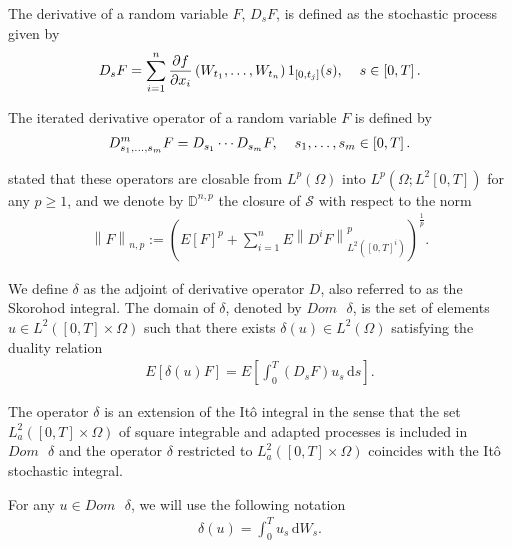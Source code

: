 \documentclass[a4paper,10pt]{article}
\renewcommand{\d}{\,\mathrm{d}}
\newcommand{\1}{\mathbf{1}}
\begin{document}
\medbreak

The derivative of a random variable $F$, $D_{s}F$, is defined as the stochastic process given by
\begin{eqnarray*}
D_{s}F = \sum^{n}_{i=1} \frac{\partial f}{\partial x_{i}}\left(W_{t_{1}}, \ldots, W_{t_{n}}\right)1_{\left[0, t_{j}\right]}(s), \hspace{0.4cm} s \in \left[0,T\right].
\end{eqnarray*}

The iterated derivative operator of a random variable $F$ is defined by
\begin{eqnarray*}
D^{m}_{s_{1}, \ldots, s_{m}} F = D_{s_{1}} \cdots D_{s_{m}}F, \hspace{0.4cm} s_{1}, \ldots, s_{m} \in \left[0,T\right].
\end{eqnarray*}

\cite{Nualart} stated that these operators are closable from $L^{p}(\Omega)$ into $L^{p}(\Omega; L^{2}\left[0,T\right])$ for any $p\geq1$, and we denote by $\mathbb{D}^{n,p}$ the closure of $\mathcal{S}$ with respect to the norm
\begin{eqnarray*}
\left\|F\right\|_{n,p} := \left(E\left[F\right]^{p} + \sum^{n}_{i=1} E\left\|D^{i} F\right\|^{p}_{L^{2}\left(\left[0,T\right]^{i}\right)} \right)^{\frac{1}{p}}.
\end{eqnarray*}

\medbreak 

We define $\delta$ as the adjoint of derivative operator $D$, also referred to as the Skorohod integral. The domain of $\delta$, denoted by $Dom\text{ }\delta$, is the set of elements $u \in L^{2}([0,T] \times \Omega)$ such that there exists $\delta(u) \in L^{2}(\Omega)$ satisfying the duality relation
\begin{eqnarray*}
E\left[\delta(u) F \right] = E\left[\int^{T}_{0} \left(D_{s} F\right) u_{s} \d s\right].
\end{eqnarray*}

The operator $\delta$ is an extension of the Itô integral in the sense that the set $L^{2}_{a}([0,T] \times \Omega)$ of square integrable and adapted processes is included in $Dom\text{ }\delta$ and the operator $\delta$ restricted to $L^{2}_{a}([0,T] \times \Omega)$ coincides with the Itô stochastic integral.

\medbreak

For any $u \in Dom\text{ }\delta$, we will use the following notation
\begin{eqnarray*}
\delta(u)=\int^{T}_{0}u_{s}\d W_{s}.
\end{eqnarray*}
\end{document}
